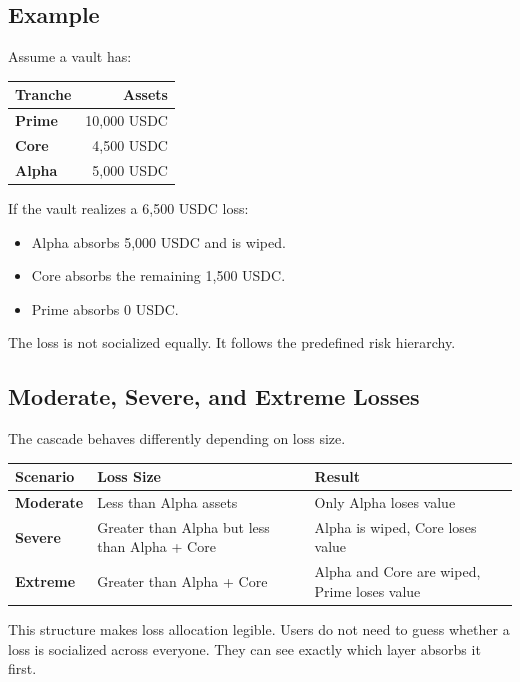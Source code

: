 \documentclass[11pt]{article}
\begin{document}
\subsection{Example}

Assume a vault has:

\begin{center}
\begin{tabular}{>{\bfseries}p{}r}
\toprule
Tranche & Assets \\
\midrule
Prime & 10,000 USDC \\
Core & 4,500 USDC \\
Alpha & 5,000 USDC \\
\bottomrule
\end{tabular}
\end{center}

If the vault realizes a 6,500 USDC loss:

\begin{itemize}
  \item Alpha absorbs 5,000 USDC and is wiped.
  \item Core absorbs the remaining 1,500 USDC.
  \item Prime absorbs 0 USDC.
\end{itemize}

The loss is not socialized equally. It follows the predefined risk hierarchy.

\subsection{Moderate, Severe, and Extreme Losses}

The cascade behaves differently depending on loss size.

\begin{center}
\begin{tabular}{>{\bfseries}p{}p{}p{}}
\toprule
Scenario & Loss Size & Result \\
\midrule
Moderate & Less than Alpha assets & Only Alpha loses value \\
Severe & Greater than Alpha but less than Alpha + Core & Alpha is wiped, Core loses value \\
Extreme & Greater than Alpha + Core & Alpha and Core are wiped, Prime loses value \\
\bottomrule
\end{tabular}
\end{center}

This structure makes loss allocation legible. Users do not need to guess whether
a loss is socialized across everyone. They can see exactly which layer absorbs
it first.
\end{document}
